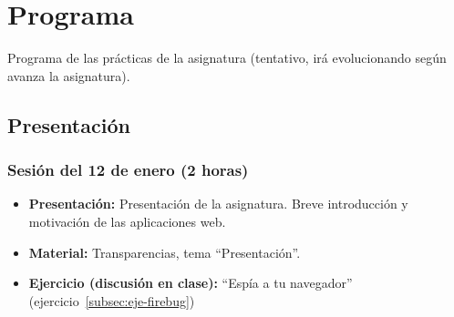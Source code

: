 \documentclass[a4paper,12pt]{report}
\begin{document}








\chapter{Programa}

Programa de las prácticas de la asignatura (tentativo, irá evolucionando según avanza la asignatura).

\section{Presentación}

\subsection{Sesión del 12 de enero (2 horas)}

\begin{itemize}
\item \textbf{Presentación:} Presentación de la asignatura. Breve introducción y motivación de las aplicaciones web.
\item \textbf{Material:} Transparencias, tema ``Presentación''.
\item \textbf{Ejercicio (discusión en clase):} ``Espía a tu navegador'' (ejercicio~\ref{subsec:eje-firebug})
\end{itemize}
  
\end{document}

